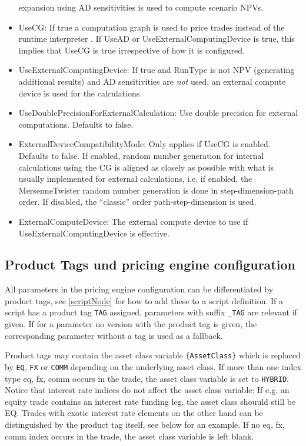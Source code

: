 \begin{itemize}
  expansion using AD sensitivities is used to compute scenario NPVs.
\item UseCG: If true a computation graph is used to price trades instead of the runtime interpreter . If UseAD or
  UseExternalComputingDevice is true, this implies that UseCG is true irrespective of how it is configured.
\item UseExternalComputingDevice: If true and RunType is not NPV (generating additional results) and AD sensitivities
  are {\em not} used, an external compute device is used for the calculations.
\item UseDoublePrecisionForExternalCalculation: Use double precision for external computations. Defaults to false.
\item ExternalDeviceCompatibilityMode: Only applies if UseCG is enabled. Defaults to false. If enabled, random number
  generation for internal calculations using the CG is aligned as closely as possible with what is usually implemented
  for external calculations, i.e. if enabled, the MersenneTwister random number generation is done in
  step-dimension-path order. If disabled, the ``classic'' order path-step-dimension is used.
\item ExternalComputeDevice: The external compute device to use if UseExternalComputingDevice is effective.
\end{itemize}

\subsection{Product Tags und pricing engine configuration}\label{producttags_engineconfig}

All parameters in the pricing engine configuration can be differentiated by product tags, see \ref{scriptNode} for how
to add these to a script definition. If a script has a product tag \verb+TAG+ assigned, parameters with suffix
\verb+_TAG+ are relevant if given. If for a parameter no version with the product tag is given, the corresponding
parameter without a tag is used as a fallback.

Product tags may contain the asset class variable \verb+{AssetClass}+ which is replaced by \verb+EQ+, \verb+FX+ or
\verb+COMM+ depending on the underlying asset class. If more than one index type eq, fx, comm occurs in the trade, the
asset class variable is set to \verb+HYBRID+. Notice that interest rate indices do not affect the asset class variable:
If e.g. an equity trade contains an interest rate funding leg, the asset class shouuld still be EQ. Trades with exotic
interest rate elements on the other hand can be distinguished by the product tag itself, see below for an example. If no
eq, fx, comm index occurs in the trade, the asset class variable is left blank.

